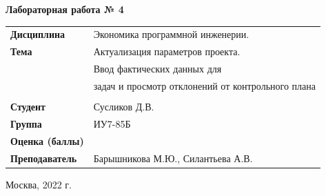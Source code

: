 \documentclass[a4paper,14pt]{extreport} %
\begin{document}
\begin{titlepage}
    \vspace{2cm}

    \begin{center}
        \textbf{Лабораторная работа № 4} \\
        \vspace{0.5cm}
    \end{center}

    \vspace{4cm}

    \begin{flushleft}
        \begin{tabular}{ll}
            \textbf{Дисциплина} & Экономика программной инженерии.  \\
            \textbf{Тема} & Актуализация параметров проекта. \\
            & Ввод фактических данных для \\
            & задач и просмотр отклонений от контрольного плана \\
            \\
            \textbf{Студент} & Сусликов Д.В. \\
            \textbf{Группа} & ИУ7-85Б \\
            \textbf{Оценка (баллы)} & \\
            \textbf{Преподаватель} & Барышникова М.Ю., Силантьева А.В.   \\
        \end{tabular}
    \end{flushleft}

    \vspace{4cm}

   \begin{center}
        Москва, 2022 г.
    \end{center}

\end{titlepage}
\end{document}
